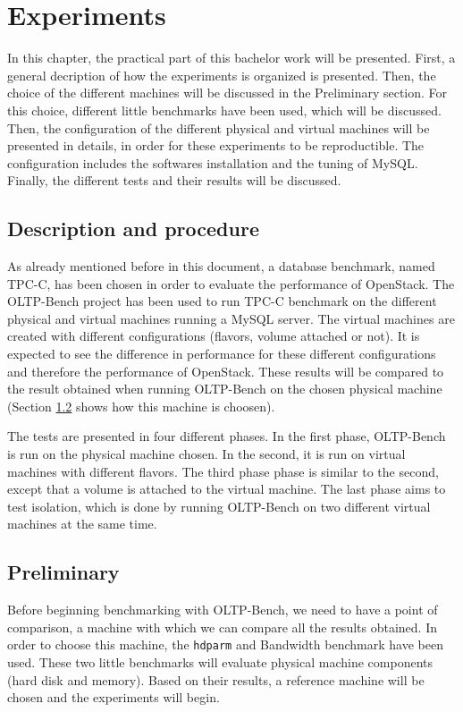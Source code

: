 

\chapter{Experiments}
In this chapter, the practical part of this bachelor work will be presented.
First, a general decription of how the experiments is organized is presented.
Then, the choice of the different machines will be discussed in the Preliminary section.
For this choice, different little benchmarks have been used, which will be discussed.
Then, the configuration of the different physical and virtual machines will be presented in details, in order for these experiments to be reproductible.
The configuration includes the softwares installation and the tuning of MySQL.
Finally, the different tests and their results will be discussed.


\section{Description and procedure}
As already mentioned before in this document, a database benchmark, named TPC-C, has been chosen in order to evaluate the performance of OpenStack.
The OLTP-Bench project has been used to run TPC-C benchmark on the different physical and virtual machines running a MySQL server.
The virtual machines are created with different configurations (flavors, volume attached or not). 
It is expected to see the difference in performance for these different configurations and therefore the performance of OpenStack.
These results will be compared to the result obtained when running OLTP-Bench on the chosen physical machine (Section \ref{sec:preliminary} shows how this machine is choosen).

The tests are presented in four different phases.
In the first phase, OLTP-Bench is run on the physical machine chosen.
In the second, it is run on virtual machines with different flavors.
The third phase phase is similar to the second, except that a volume is attached to the virtual machine.
The last phase aims to test isolation, which is done by running OLTP-Bench on two different virtual machines at the same time.




\section{Preliminary}
\label{sec:preliminary}
Before beginning benchmarking with OLTP-Bench, we need to have a point of comparison, a machine with which we can compare all the results obtained. 
In order to choose this machine, the \texttt{hdparm} and Bandwidth benchmark have been used. 
These two little benchmarks will evaluate physical machine components (hard disk and memory).
Based on their results, a reference machine will be chosen and the experiments will begin.


